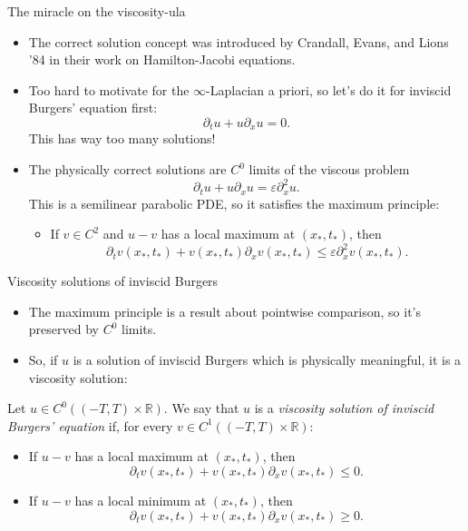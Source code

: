 \documentclass[10pt]{beamer}
\newcommand{\RR}{\mathbb{R}}
\begin{document}
\begin{frame}{The miracle on the viscosity-ula}
\begin{itemize}
\item The correct solution concept was introduced by Crandall, Evans, and Lions '84 in their work on Hamilton-Jacobi equations. \pause
\item Too hard to motivate for the $\infty$-Laplacian a priori, so let's do it for inviscid Burgers' equation first:
$$\partial_t u + u \partial_x u = 0.$$
This has way too many solutions! \pause
\item The physically correct solutions are $C^0$ limits of the viscous problem 
$$\partial_t u + u \partial_x u = \varepsilon \partial_x^2 u.$$
This is a semilinear parabolic PDE, so it satisfies the maximum principle: \pause
\begin{itemize}
\item If $v \in C^2$ and $u - v$ has a local maximum at $(x_*, t_*)$, then
$$\partial_t v(x_*, t_*) + v(x_*, t_*) \partial_x v(x_*, t_*) \leq \varepsilon \partial_x^2 v(x_*, t_*).$$
\end{itemize}
\end{itemize}
\end{frame}

\begin{frame}{Viscosity solutions of inviscid Burgers}
\begin{itemize}
\item The maximum principle is a result about pointwise comparison, so it's preserved by $C^0$ limits. \pause
\item So, if $u$ is a solution of inviscid Burgers which is physically meaningful, it is a viscosity solution: \pause
\end{itemize}

\begin{definition}
Let $u \in C^0((-T, T) \times \RR)$. We say that $u$ is a \emph{viscosity solution of inviscid Burgers' equation} if, for every $v \in C^1((-T, T) \times \RR)$: \pause
\begin{itemize}
\item If $u - v$ has a local maximum at $(x_*, t_*)$, then
$$\partial_t v(x_*, t_*) + v(x_*, t_*) \partial_x v(x_*, t_*) \leq 0.$$
\item If $u - v$ has a local minimum at $(x_*, t_*)$, then 
$$\partial_t v(x_*, t_*) + v(x_*, t_*) \partial_x v(x_*, t_*) \geq 0.$$
\end{itemize}
\end{definition}
\end{frame}
\end{document}

